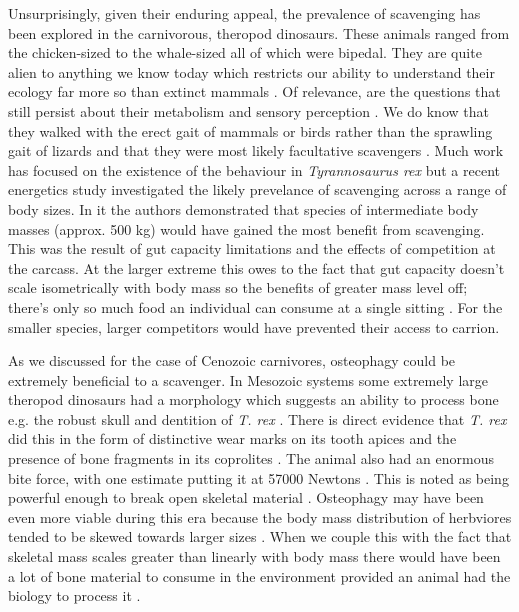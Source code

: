 \documentclass[a4paper,12pt]{article}
\begin{document}
Unsurprisingly, given their enduring appeal, the prevalence of scavenging has been explored in the carnivorous, theropod dinosaurs. These animals ranged from the chicken-sized to the whale-sized all of which were bipedal. They are quite alien to anything we know today which restricts our ability to understand their ecology far more so than extinct mammals \citep{weishampel2004dinosauria}. Of relevance, are the questions that still persist about their metabolism \citep{grady2014evidence} and sensory perception \citep{farlow1994speculations}. We do know that they walked with the erect gait of mammals or birds rather than the sprawling gait of lizards and that they were most likely facultative scavengers \citep{weishampel2004dinosauria,depalma2013physical}. Much work has focused on the existence of the behaviour in \textit{Tyrannosaurus rex} \citep{ruxton2003could,carbone2011intra} but a recent energetics study investigated the likely prevelance of scavenging across a range of body sizes. In it the authors demonstrated that species of intermediate body masses (approx. 500 kg) would have gained the most benefit from scavenging. This was the result of gut capacity limitations and the effects of competition at the carcass. At the larger extreme this owes to the fact that gut capacity doesn't scale isometrically with body mass so the benefits of greater mass level off; there's only so much food an individual can consume at a single sitting \citep{calder1996size}. For the smaller species, larger competitors would have prevented their access to carrion. 

As we discussed for the case of Cenozoic carnivores, osteophagy could be extremely beneficial to a scavenger. 
In Mesozoic systems some extremely large theropod dinosaurs had a morphology which suggests an ability to process bone e.g. the robust skull and dentition of \textit{T. rex} \citep{hone2010feeding}. There is direct evidence that \textit{T. rex} did this in the form of distinctive wear marks on its tooth apices \citep{farlow1994wear,schubert2005wear} and the presence of bone fragments in its coprolites \citep{chin1998king}. The animal also had an enormous bite force, with one estimate putting it at 57000 Newtons \citep{bates2012estimating}. This is noted as being powerful enough to break open skeletal material \citep{rayfield2001cranial}. Osteophagy may have been even more viable during this era because the body mass distribution of herbviores tended to be skewed towards larger sizes \citep{10.1371/journal.pone.0051925}. When we couple this with the fact that skeletal mass scales greater than linearly with body mass \citep{prange1979scaling} there would have been a lot of bone material to consume in the environment provided an animal had the biology to process it \citep{chure1997one}. 
\end{document}
